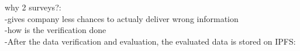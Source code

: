 why 2 surveys?:\\
-gives company less chances to actualy deliver wrong information\\
-how is the verification done\\
-After the data verification and evaluation, the evaluated data is stored on IPFS:
